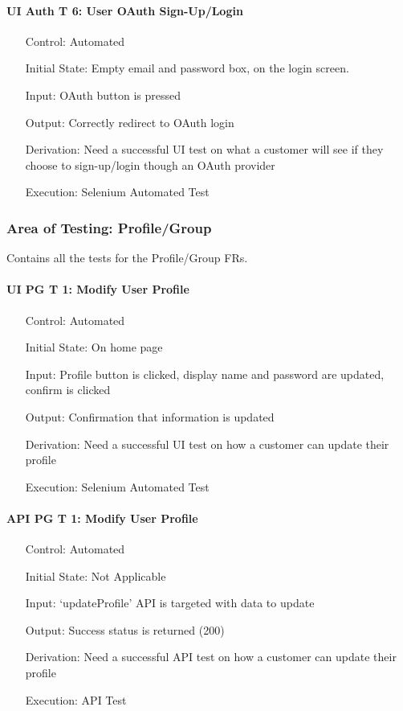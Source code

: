 \documentclass[12pt, titlepage]{article}
\begin{document}
\paragraph*{UI Auth T 6: User OAuth Sign-Up/Login}
\begin{itemize}
	\item[Control:] Automated
	\item[Initial State:] Empty email and password box, on the login screen.
	\item[Input:] OAuth button is pressed
	\item[Output:] Correctly redirect to OAuth login
	\item[Derivation:] Need a successful UI test on what a customer will see if they choose to sign-up/login though an OAuth provider
	\item[Execution:] Selenium Automated Test
\end{itemize}

\subsubsection{Area of Testing: Profile/Group}
Contains all the tests for the Profile/Group FRs.

\paragraph*{UI PG T 1: Modify User Profile}
\begin{itemize}
	\item[Control:] Automated
	\item[Initial State:] On home page
	\item[Input:] Profile button is clicked, display name and password are updated, confirm is clicked
	\item[Output:] Confirmation that information is updated
	\item[Derivation:] Need a successful UI test on how a customer can update their profile
	\item[Execution:] Selenium Automated Test
\end{itemize}

\paragraph*{API PG T 1: Modify User Profile}
\begin{itemize}
	\item[Control:] Automated
	\item[Initial State:] Not Applicable
	\item[Input:] `updateProfile' API is targeted with data to update
	\item[Output:] Success status is returned (200)
	\item[Derivation:] Need a successful API test on how a customer can update their profile
	\item[Execution:] API Test
\end{itemize}
\end{document}
